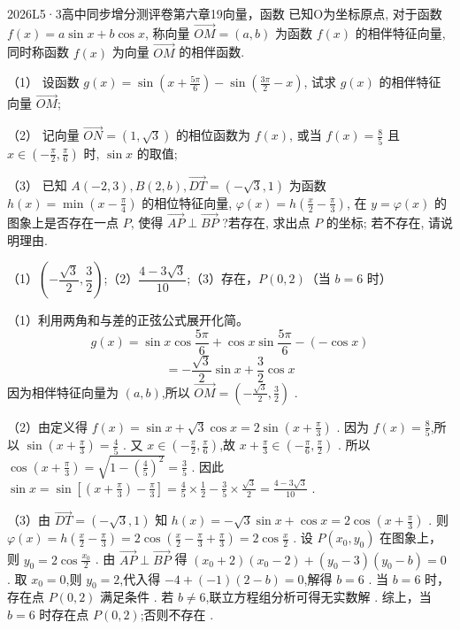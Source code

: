 \documentclass[12pt,UTF-8,a4paper]{ctexart}
\numberwithin{figure}{section}
\theoremstyle{mystyle}
\theoremstyle{mystylekaishu}
\theoremstyle{mystyle}
\numberwithin{xiti}{section}
\begin{document}
\begin{problem}{2026}{L}{5·3高中同步增分测评卷第六章}{19}{向量，函数}
已知O为坐标原点, 对于函数 $f(x)=a \sin x+b \cos x$, 称向量 $\overrightarrow{O M}=(a, b)$ 为函数 $f(x)$ 的相伴特征向量, 同时称函数 $f(x)$ 为向量 $\overrightarrow{O M}$ 的相伴函数.

（1） 设函数 $g(x)=\sin \left(x+\frac{5 \pi}{6}\right)-\sin \left(\frac{3 \pi}{2}-x\right)$, 试求 $g(x)$ 的相伴特征向量 $\overrightarrow{O M}$;

（2） 记向量 $\overrightarrow{O N}=(1, \sqrt{3})$ 的相位函数为 $f(x)$, 或当 $f(x)=\frac{8}{5}$ 且 $x \in\left(-\frac{\pi}{2}, \frac{\pi}{6}\right)$ 时, $\sin x$ 的取值;

（3） 已知 $A(-2,3), B(2, b), \overrightarrow{D T}=(-\sqrt{3}, 1)$ 为函数 $h(x)=\min \left(x-\frac{\pi}{4}\right)$ 的相位特征向量, $\varphi(x)=h\left(\frac{x}{2}-\frac{\pi}{3}\right)$, 在 $y=\varphi(x)$ 的图象上是否存在一点 $P$, 使得 $\overrightarrow{A P} \perp \overrightarrow{B P}$ ?若存在, 求出点 $P$ 的坐标; 若不存在, 请说明理由.

\end{problem}

\begin{answer}
（1）$\boxed{\left(-\dfrac{\sqrt{3}}{2}, \dfrac{3}{2}\right)}$;（2）$\boxed{\dfrac{4-3\sqrt{3}}{10}}$;（3）存在，$\boxed{P(0,2)}$（当 $b=6$ 时）
\end{answer}

\begin{solutions}
（1）利用两角和与差的正弦公式展开化简。
$$
g(x)=\sin x\cos\frac{5\pi}{6}+\cos x\sin\frac{5\pi}{6}-(-\cos x)
$$
$$
=-\frac{\sqrt{3}}{2}\sin x+\frac{3}{2}\cos x
$$
因为相伴特征向量为 $(a,b)$,所以 $\overrightarrow{OM}=\left(-\frac{\sqrt{3}}{2}, \frac{3}{2}\right)$ .

（2）由定义得 $f(x)=\sin x+\sqrt{3}\cos x=2\sin\left(x+\frac{\pi}{3}\right)$ .
因为 $f(x)=\frac{8}{5}$,所以 $\sin\left(x+\frac{\pi}{3}\right)=\frac{4}{5}$ .
又 $x\in\left(-\frac{\pi}{2}, \frac{\pi}{6}\right)$,故 $x+\frac{\pi}{3}\in\left(-\frac{\pi}{6}, \frac{\pi}{2}\right)$ .
所以 $\cos\left(x+\frac{\pi}{3}\right)=\sqrt{1-\left(\frac{4}{5}\right)^2}=\frac{3}{5}$ .
因此 $\sin x=\sin\left[\left(x+\frac{\pi}{3}\right)-\frac{\pi}{3}\right]=\frac{4}{5}\times\frac{1}{2}-\frac{3}{5}\times\frac{\sqrt{3}}{2}=\frac{4-3\sqrt{3}}{10}$ .

（3）由 $\overrightarrow{DT}=(-\sqrt{3},1)$ 知 $h(x)=-\sqrt{3}\sin x+\cos x=2\cos\left(x+\frac{\pi}{3}\right)$ .
则 $\varphi(x)=h\left(\frac{x}{2}-\frac{\pi}{3}\right)=2\cos\left(\frac{x}{2}-\frac{\pi}{3}+\frac{\pi}{3}\right)=2\cos\frac{x}{2}$ .
设 $P(x_0,y_0)$ 在图象上，则 $y_0=2\cos\frac{x_0}{2}$ .
由 $\overrightarrow{AP}\perp\overrightarrow{BP}$ 得 $(x_0+2)(x_0-2)+(y_0-3)(y_0-b)=0$ .
取 $x_0=0$,则 $y_0=2$,代入得 $-4+(-1)(2-b)=0$,解得 $b=6$ .
当 $b=6$ 时，存在点 $P(0,2)$ 满足条件 .
若 $b\neq 6$,联立方程组分析可得无实数解 .
综上，当 $b=6$ 时存在点 $P(0,2)$;否则不存在 .
\end{solutions}
\end{document}
